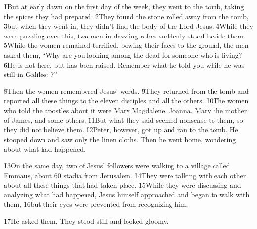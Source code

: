 \v{1}But at early dawn on the first day of the week, they went to the tomb, taking the spices they had prepared. \v{2}They found the stone rolled away from the tomb, \v{3}but when they went in, they didn't find the body of the Lord Jesus. \v{4}While they were puzzling over this, two men in dazzling robes suddenly stood beside them. \v{5}While the women remained terrified, bowing their faces to the ground, the men asked them, ``Why are you looking among the dead for someone who is living? \v{6}He is not here, but has been raised. Remember what he told you while he was still in Galilee: \v{7}''

\v{8}Then the women remembered Jesus' words. \v{9}They returned from the tomb and reported all these things to the eleven disciples and all the others. \v{10}The women who told the apostles about it were Mary Magdalene, Joanna, Mary the mother of James, and some others. \v{11}But what they said seemed nonsense to them, so they did not believe them. \v{12}Peter, however, got up and ran to the tomb. He stooped down and saw only the linen cloths. Then he went home, wondering about what had happened.

\v{13}On the same day, two of Jesus' followers were walking to a village called Emmaus, about 60 stadia from Jerusalem. \v{14}They were talking with each other about all these things that had taken place. \v{15}While they were discussing and analyzing what had happened, Jesus himself approached and began to walk with them, \v{16}but their eyes were prevented from recognizing him.

\v{17}He asked them,  They stood still and looked gloomy.

